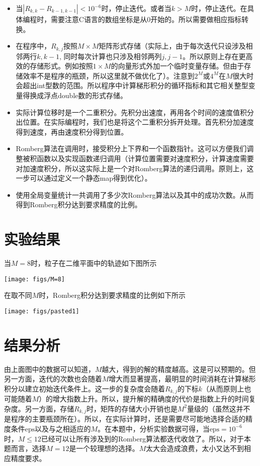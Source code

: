 \documentclass[english]{ctexart}
\begin{document}
\begin{itemize}
\item 当$|R_{k,k}-R_{k-1,k-1}|<10^{-6}$时，停止迭代。或者当$k>M$时，停止迭代。在具体编程时，需要注意C语言的数组坐标是从$0$开始的。所以需要做相应指标转换。
\item 在程序中，$R_{k,j}$按照$M\times M$矩阵形式存储（实际上，由于每次迭代只设涉及相邻两行$k,k-1$, 同时每次计算也只涉及相邻两列$j,j-1$。所以原则上存在更高效的存储形式。例如按照$1\times M$的向量形式外加一个临时变量存储。但由于存储效率不是程序的瓶颈，所以这里就不做优化了）。注意到$2^{M}$或$4^{M}$在$M$很大时会超出int型数的范围。所以程序中计算梯形积分的循环指标和其它相关整型变量得换成浮点double数的形式存储。
\item 实际计算位移时是一个二重积分。先积分出速度，再用各个时间的速度值积分出位置。在实际编程时，我们也是将这个二重积分拆开处理。首先积分加速度得到速度，再由速度积分得到位置。
\item Romberg算法在调用时，接受积分上下界和一个函数指针。这可以方便我们调整被积函数以及实现函数递归调用（计算位置需要对速度积分，计算速度需要对加速度积分，所以这实际上是一个对Romberg算法的递归调用。原则上，这一步可以通过定义一个静态map得到优化）。
\item 使用全局变量统计一共调用了多少次Romberg算法以及其中的成功次数。从而得到Romberg积分达到要求精度的比例。
\end{itemize}

\section{实验结果}

当$M=8$时，粒子在二维平面中的轨迹如下图所示

\texttt{[image: figs/M=8]}

在取不同$M$时，Romberg积分达到要求精度的比例如下所示

\texttt{[image: figs/pasted1]}

\section{结果分析}

由上面图中的数据可以知道，$M$越大，得到的解的精度越高。这是可以预期的。但另一方面，迭代的次数也会随着$M$增大而显著提高，最明显的时间消耗在计算梯形积分以建立初始迭代条件上。这一步的复杂度会随着$R_{k,j}$的下标$k$（从而原则上也可能随着$M$）的增大指数上升。所以，提升解的精确度的代价是指数上升的时间复杂度。另一方面，存储$R_{k,j}$时，矩阵的存储大小开销也是$M^{2}$量级的（虽然这并不是程序的主要瓶颈所在）。所以，在实际计算时，还是需要尽可能地选择合适的精度条件$\mathrm{eps}$以及与之相适应的$M$。在本题中，分析实验数据可得，当$\mathrm{eps}=10^{-6}$时，$M\leq12$已经可以让所有涉及到的Romberg算法都迭代收敛了。所以，对于本题而言，选择$M=12$是一个较理想的选择。$M$太大会造成浪费，太小又达不到相应精度要求。
\end{document}
